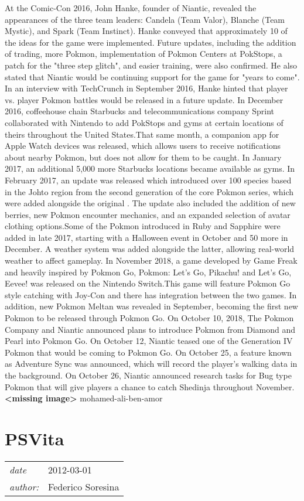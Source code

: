 \documentclass[a4paper,10pt]{book}
\newcommand{\pageHeader}[4]{
    \section{#1}
    \vspace{-0.3cm}
    \begin{table}[h!]
     \begin{tabular}{ll}
        \hline
        \textit{date} & #2 \\
        \textit{author: } & #3\\
        \hline
     \end{tabular}
    \end{table}
    \vspace{-0.3cm}
}
\begin{document}
 At the Comic-Con 2016, John Hanke, founder of Niantic, revealed the appearances of the three team leaders: Candela (Team Valor), Blanche (Team Mystic), and Spark (Team Instinct). Hanke conveyed that approximately 10 of the ideas for the game were implemented. Future updates, including the addition of trading, more Pokmon, implementation of Pokmon Centers at PokStops, a patch for the "three step glitch", and easier training, were also confirmed. He also stated that Niantic would be continuing support for the game for "years to come". In an interview with TechCrunch in September 2016, Hanke hinted that player vs. player Pokmon battles would be released in a future update. In December 2016, coffeehouse chain Starbucks and telecommunications company Sprint collaborated with Nintendo to add PokStops and gyms at certain locations of theirs throughout the United States.That same month, a companion app for Apple Watch devices was released, which allows users to receive notifications about nearby Pokmon, but does not allow for them to be caught. In January 2017, an additional 5,000 more Starbucks locations became available as gyms. In February 2017, an update was released which introduced over 100 species based in the Johto region from the second generation of the core Pokmon series, which were added alongside the original . The update also included the addition of new berries, new Pokmon encounter mechanics, and an expanded selection of avatar clothing options.Some of the Pokmon introduced in Ruby and Sapphire were added in late 2017, starting with a Halloween event in October and 50 more in December. A weather system was added alongside the latter, allowing real-world weather to affect gameplay. In November 2018, a game developed by Game Freak and heavily inspired by Pokmon Go, Pokmon: Let's Go, Pikachu! and Let's Go, Eevee! was released on the Nintendo Switch.This game will feature Pokmon Go style catching with Joy-Con and there has integration between the two games. In addition, new Pokmon Meltan was revealed in September, becoming the first new Pokmon to be released through Pokmon Go. On October 10, 2018, The Pokmon Company and Niantic announced plans to introduce Pokmon from Diamond and Pearl into Pokmon Go. On October 12, Niantic teased one of the Generation IV Pokmon that would be coming to Pokmon Go. On October 25, a feature known as Adventure Sync was announced, which will record the player's walking data in the background. On October 26, Niantic announced research tasks for Bug type Pokmon that will give players a chance to catch Shedinja throughout November. 
 \textbf{<missing image>}
 mohamed-ali-ben-amor 
 \newpage\pageHeader{PSVita}{2012-03-01}{Federico Soresina}{PlayStation Vita description page}
\end{document}
